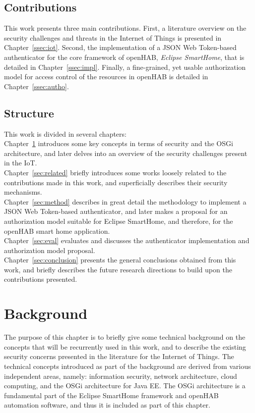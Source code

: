 \documentclass[12pt]{article}
\begin{document}
\subsection{Contributions}

This work presents three main contributions. First, a literature overview on the security challenges and threats in the Internet of Things is presented in Chapter~\ref{ssec:iot}. Second, the implementation of a JSON Web Token-based authenticator for the core framework of openHAB, \emph{Eclipse SmartHome}, that is detailed in Chapter~\ref{ssec:impl}. Finally, a fine-grained, yet usable authorization model for access control of the resources in openHAB is detailed in Chapter~\ref{ssec:autho}.

\subsection{Structure}

This work is divided in several chapters:\\
Chapter~\ref{sec:art} introduces some key concepts in terms of security and the OSGi architecture, and later delves into an overview of the security challenges present in the IoT. \\
Chapter~\ref{sec:related} briefly introduces some works loosely related to the contributions made in this work, and superficially describes their security mechanisms.\\
Chapter~\ref{sec:method} describes in great detail the methodology to implement a JSON Web Token-based authenticator, and later makes a proposal for an authorization model suitable for Eclipse SmartHome, and therefore, for the openHAB smart home application. \\
Chapter~\ref{sec:eval} evaluates and discusses the authenticator implementation and authorization model proposal.\\
Chapter~\ref{sec:conclusion} presents the general conclusions obtained from this work, and briefly describes the future research directions to build upon the contributions presented.


\newpage
\section{Background} 
\label{sec:art}
The purpose of this chapter is to briefly give some technical background on the concepts that will be recurrently used in this work, and to describe the existing security concerns presented in the literature for the Internet of Things. The technical concepts introduced as part of the background are derived from various independent areas, namely: information security, network architecture, cloud computing, and the OSGi architecture for Java EE. The OSGi architecture is a fundamental part of the Eclipse SmartHome framework and openHAB automation software, and thus it is included as part of this chapter.
\end{document}
